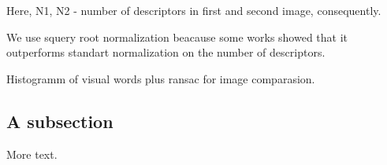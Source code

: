 \documentclass[11pt]{article} %
\begin{document}
Here, N1, N2 - number of descriptors in first and second image, consequently.

We use squery root normalization beacause some works\cite{jegou:inria-00602325} showed that it
outperforms standart normalization on the number of descriptors.


Histogramm of visual words plus ransac for image comparasion.

\subsection{A subsection}

More text.




\end{document}
